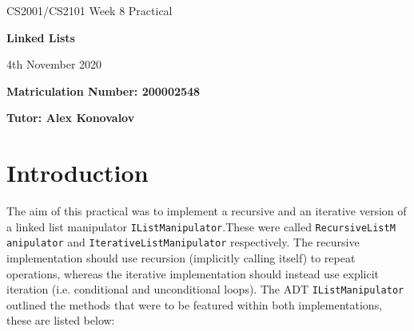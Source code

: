 \documentclass{article}
\begin{document}
\nocite{*}

\begin{center}
\Huge 
CS2001/CS2101 Week 8 Practical

\vspace{0.5cm}

\textbf{Linked Lists}

\vspace{1cm}
\LARGE
4th November 2020

\large
\vspace{1.5cm}

\textbf{Matriculation Number: 200002548}

\vspace{0.5cm}

\textbf{Tutor: Alex Konovalov}

\end{center}

\newpage

\tableofcontents

\newpage
\section{Introduction}
The aim of this practical was to implement a recursive and an iterative version of a linked list manipulator \verb+IListManipulator+.These were called \verb+RecursiveListM+ \verb+anipulator+ and \verb+IterativeListManipulator+ respectively. The recursive implementation should use recursion (implicitly calling itself) to repeat operations, whereas the iterative implementation should instead use explicit iteration (i.e. conditional and unconditional loops). The ADT \verb+IListManipulator+ outlined the methods that were to be featured within both implementations, these are listed below:
\end{document}
